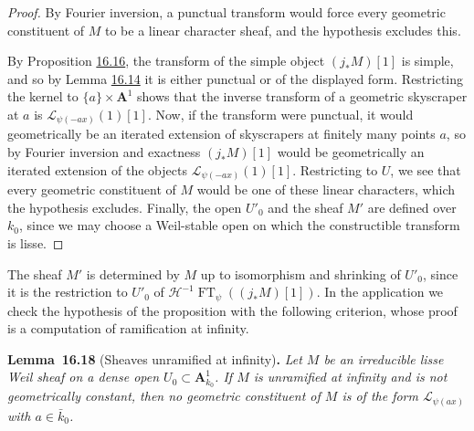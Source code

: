 \documentclass[11pt]{article}
\newenvironment{bpstatement}[2]{\par\addvspace{0.6\baselineskip}\noindent\textbf{#1}#2\textbf{.}\enspace\ignorespaces}
  {\par\addvspace{0.4\baselineskip}}
\newenvironment{bpstatementit}[2]{\begin{bpstatement}{#1}{#2}\itshape\ignorespaces}{\end{bpstatement}}
\begin{document}
\begin{proof}[{Proof}]\label{bp53}%
By Fourier inversion, a punctual transform would force every geometric constituent of \(M\) to be a linear character sheaf, and the hypothesis excludes this.

By Proposition \hyperref[bp48]{16.16}, the transform of the simple object \((j_*M)[1]\) is simple, and so by Lemma \hyperref[bp43]{16.14} it is either punctual or of the displayed form. Restricting the kernel to \(\{a\}\times\mathbf A^1\) shows that the inverse transform of a geometric skyscraper at \(a\) is \(\mathcal L_{\psi(-ax)}(1)[1]\). Now, if the transform were punctual, it would geometrically be an iterated extension of skyscrapers at finitely many points \(a\), so by Fourier inversion and exactness \((j_*M)[1]\) would be geometrically an iterated extension of the objects \(\mathcal L_{\psi(-ax)}(1)[1]\). Restricting to \(U\), we see that every geometric constituent of \(M\) would be one of these linear characters, which the hypothesis excludes. Finally, the open \(U'_0\) and the sheaf \(M'\) are defined over \(k_0\), since we may choose a Weil-stable open on which the constructible transform is lisse.
\end{proof}

\label{bp54}%
The sheaf \(M'\) is determined by \(M\) up to isomorphism and shrinking of \(U'_0\), since it is the restriction to \(U'_0\) of \(\mathcal H^{-1}\operatorname{FT}_\psi((j_*M)[1])\). In the application we check the hypothesis of the proposition with the following criterion, whose proof is a computation of ramification at infinity.

\label{bp55}%
\begin{bpstatementit}{Lemma~16.18}{ (Sheaves unramified at infinity)}
Let \(M\) be an irreducible lisse Weil sheaf on a dense open \(U_0\subset\mathbf A^1_{k_0}\). If \(M\) is unramified at infinity and is not geometrically constant, then no geometric constituent of \(M\) is of the form \(\mathcal L_{\psi(ax)}\) with \(a\in\bar k_0\).
\end{bpstatementit}
\end{document}
